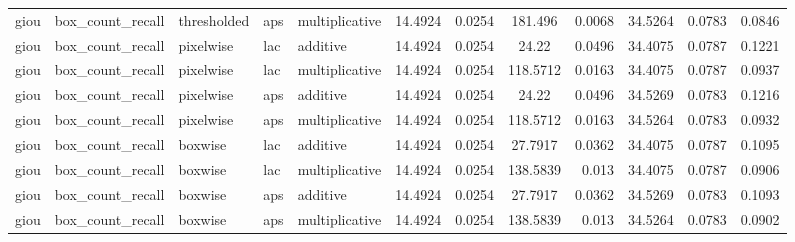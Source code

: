\begin{table*}[htbp]
\begin{tabular}{@{}lllll rrcrrcr@{}}
giou & box\_count\_recall & thresholded & aps & multiplicative & 14.4924 & 0.0254 & 181.496 & 0.0068 & 34.5264 & 0.0783 & 0.0846 \\
giou & box\_count\_recall & pixelwise & lac & additive & 14.4924 & 0.0254 & 24.22 & 0.0496 & 34.4075 & 0.0787 & 0.1221 \\
giou & box\_count\_recall & pixelwise & lac & multiplicative & 14.4924 & 0.0254 & 118.5712 & 0.0163 & 34.4075 & 0.0787 & 0.0937 \\
giou & box\_count\_recall & pixelwise & aps & additive & 14.4924 & 0.0254 & 24.22 & 0.0496 & 34.5269 & 0.0783 & 0.1216 \\
giou & box\_count\_recall & pixelwise & aps & multiplicative & 14.4924 & 0.0254 & 118.5712 & 0.0163 & 34.5264 & 0.0783 & 0.0932 \\
giou & box\_count\_recall & boxwise & lac & additive & 14.4924 & 0.0254 & 27.7917 & 0.0362 & 34.4075 & 0.0787 & 0.1095 \\
giou & box\_count\_recall & boxwise & lac & multiplicative & 14.4924 & 0.0254 & 138.5839 & 0.013 & 34.4075 & 0.0787 & 0.0906 \\
giou & box\_count\_recall & boxwise & aps & additive & 14.4924 & 0.0254 & 27.7917 & 0.0362 & 34.5269 & 0.0783 & 0.1093 \\
giou & box\_count\_recall & boxwise & aps & multiplicative & 14.4924 & 0.0254 & 138.5839 & 0.013 & 34.5264 & 0.0783 & 0.0902 \\
    \bottomrule
    \end{tabular}
    \end{table*}
    